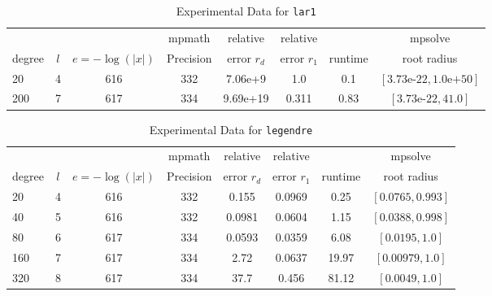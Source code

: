 \documentclass[sigconf]{acmart}
\begin{document}
\begin{table}[t]
\caption{Experimental Data for \texttt{lar1}} %
\label{tab:lar1}
\vskip -0.15in
\begin{center}
\begin{small}
\begin{sc}
\begin{tabular}{lccccccc}
\toprule
&  &  & mpmath & relative  & relative &  & mpsolve \\
degree  & $l$& $e=-\log(|x|)$& Precision &error $r_d$       & error $r_1$ &runtime& root radius\\
\midrule
 20 & 4 & 616 & 332 & 7.06e+9 & 1.0 & 0.1 & $[3.73\text{e-}22, 1.0\text{e+}50]$\\
 200 & 7 & 617 & 334 & 9.69e+19 & 0.311 & 0.83 & $[3.73\text{e-}22, 41.0]$\\
\bottomrule
\end{tabular}
\end{sc}
\end{small}
\end{center}
\vskip 0.05in
\end{table}

\begin{table}[t]
\caption{Experimental Data for \texttt{legendre}} %
\label{tab:legendre}
\vskip -0.15in
\begin{center}
\begin{small}
\begin{sc}
\begin{tabular}{lccccccc}
\toprule
&  &  & mpmath & relative  & relative &  & mpsolve \\
degree  & $l$& $e=-\log(|x|)$& Precision &error $r_d$       & error $r_1$ &runtime& root radius\\
\midrule
 20 & 4 & 616 & 332 & 0.155 & 0.0969 & 0.25 & $[0.0765, 0.993]$\\
 40 & 5 & 616 & 332 & 0.0981 & 0.0604 & 1.15 & $[0.0388, 0.998]$\\
 80 & 6 & 617 & 334 & 0.0593 & 0.0359 & 6.08 & $[0.0195, 1.0]$\\
  160 & 7 & 617 & 334 & 2.72 & 0.0637 & 19.97 & $[0.00979, 1.0]$\\
 320 & 8 & 617 & 334 & 37.7 & 0.456 & 81.12 & $[0.0049, 1.0]$\\
\bottomrule
\end{tabular}
\end{sc}
\end{small}
\end{center}
\vskip 0.05in
\end{table}
\end{document}
